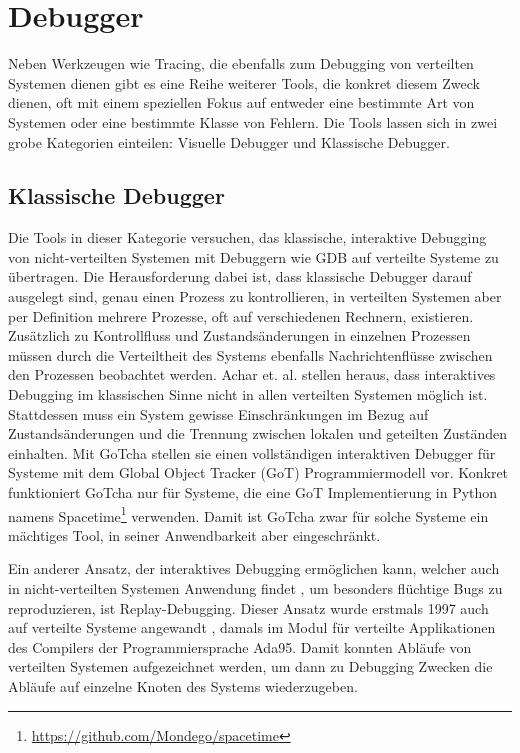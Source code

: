 \documentclass[12pt,a4paper]{report}
\begin{document}
\section{Debugger}
Neben Werkzeugen wie Tracing, die ebenfalls zum Debugging von verteilten Systemen dienen gibt es eine Reihe weiterer Tools, die
konkret diesem Zweck dienen, oft mit einem speziellen Fokus auf entweder eine bestimmte Art von Systemen oder eine bestimmte
Klasse von Fehlern. Die Tools lassen sich in zwei grobe Kategorien einteilen: Visuelle Debugger und Klassische Debugger.

\subsection{Klassische Debugger}
Die Tools in dieser Kategorie versuchen, das klassische, interaktive Debugging von nicht-verteilten Systemen mit Debuggern wie GDB
auf verteilte Systeme zu übertragen. Die Herausforderung dabei ist, dass klassische Debugger darauf ausgelegt sind, genau einen
Prozess zu kontrollieren, in verteilten Systemen aber per Definition mehrere Prozesse, oft auf verschiedenen Rechnern, existieren.
Zusätzlich zu Kontrollfluss und Zustandsänderungen in einzelnen Prozessen müssen durch die Verteiltheit des Systems ebenfalls
Nachrichtenflüsse zwischen den Prozessen beobachtet werden. Achar et. al. \cite{gotcha_interactive_debugger} stellen heraus, dass
interaktives Debugging im klassischen Sinne nicht in allen verteilten Systemen möglich ist. Stattdessen muss ein
System gewisse Einschränkungen im Bezug auf Zustandsänderungen und die Trennung zwischen lokalen und geteilten Zuständen
einhalten. Mit GoTcha \cite{gotcha_interactive_debugger} stellen sie einen vollständigen interaktiven Debugger für Systeme mit dem
Global Object Tracker (GoT) Programmiermodell vor. Konkret funktioniert GoTcha nur für Systeme, die eine GoT Implementierung in
Python namens Spacetime\footnote{\url{https://github.com/Mondego/spacetime}} verwenden. Damit ist GoTcha zwar für solche Systeme
ein mächtiges Tool, in seiner Anwendbarkeit aber eingeschränkt.

Ein anderer Ansatz, der interaktives Debugging ermöglichen kann, welcher auch in nicht-verteilten Systemen Anwendung findet
\cite{normal_record_and_replay}, um besonders flüchtige Bugs zu reproduzieren, ist Replay-Debugging. Dieser Ansatz wurde erstmals
1997 auch auf verteilte Systeme angewandt \cite{distributed_replay_debugging_1997}, damals im Modul für verteilte
Applikationen des Compilers der Programmiersprache Ada95. Damit konnten Abläufe von verteilten Systemen aufgezeichnet werden, um
dann zu Debugging Zwecken die Abläufe auf einzelne Knoten des Systems wiederzugeben.
\end{document}
